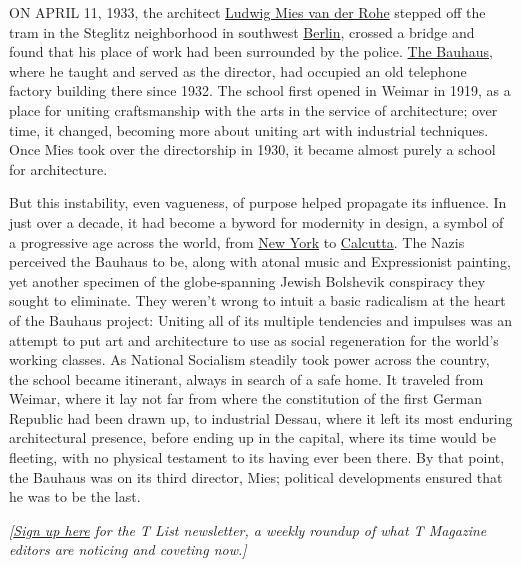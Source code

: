 ON APRIL 11, 1933, the architect
\href{https://www.nytimes3xbfgragh.onion/topic/person/ludwig-mies-van-der-rohe}{Ludwig
Mies van der Rohe} stepped off the tram in the Steglitz neighborhood in
southwest
\href{https://www.nytimes3xbfgragh.onion/2018/08/23/t-magazine/berlin-guide.html}{Berlin},
crossed a bridge and found that his place of work had been surrounded by
the police.
\href{https://www.nytimes3xbfgragh.onion/2016/08/14/travel/bauhaus-germany-art-design.html}{The
Bauhaus}, where he taught and served as the director, had occupied an
old telephone factory building there since 1932. The school first opened
in Weimar in 1919, as a place for uniting craftsmanship with the arts in
the service of architecture; over time, it changed, becoming more about
uniting art with industrial techniques. Once Mies took over the
directorship in 1930, it became almost purely a school for architecture.

But this instability, even vagueness, of purpose helped propagate its
influence. In just over a decade, it had become a byword for modernity
in design, a symbol of a progressive age across the world, from
\href{https://www.nytimes3xbfgragh.onion/interactive/2016/11/03/travel/what-to-do-36-hours-manhattan-new-york-city.html}{New
York} to
\href{https://www.nytimes3xbfgragh.onion/2018/11/22/travel/budget-travel-kolkata-india.html?login=email\&auth=login-email}{Calcutta}.
The Nazis perceived the Bauhaus to be, along with atonal music and
Expressionist painting, yet another specimen of the globe-spanning
Jewish Bolshevik conspiracy they sought to eliminate. They weren't wrong
to intuit a basic radicalism at the heart of the Bauhaus project:
Uniting all of its multiple tendencies and impulses was an attempt to
put art and architecture to use as social regeneration for the world's
working classes. As National Socialism steadily took power across the
country, the school became itinerant, always in search of a safe home.
It traveled from Weimar, where it lay not far from where the
constitution of the first German Republic had been drawn up, to
industrial Dessau, where it left its most enduring architectural
presence, before ending up in the capital, where its time would be
fleeting, with no physical testament to its having ever been there. By
that point, the Bauhaus was on its third director, Mies; political
developments ensured that he was to be the last.

\emph{{[}}\href{https://www.nytimes3xbfgragh.onion/newsletters/t-list?module=inline}{\emph{Sign
up here}} \emph{for the T List newsletter, a weekly roundup of what T
Magazine editors are noticing and coveting now.{]}}


